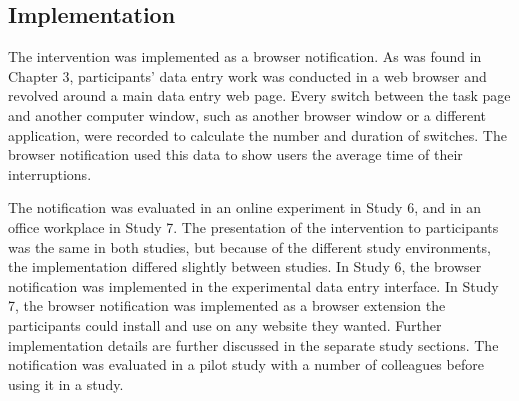 \subsection{Implementation}
The intervention was implemented as a browser notification. As was found in Chapter 3, participants’ data entry work was conducted in a web browser and revolved around a main data entry web page. Every switch between the task page and another computer window, such as another browser window or a different application, were recorded to calculate the number and duration of switches. The browser notification used this data to show users the average time of their interruptions. 

The notification was evaluated in an online experiment in Study 6, and in an office workplace in Study 7. The presentation of the intervention to participants was the same in both studies, but because of the different study environments, the implementation differed slightly between studies. In Study 6, the browser notification was implemented in the experimental data entry interface. In Study 7, the browser notification was implemented as a browser extension the participants could install and use on any website they wanted. Further implementation details are further discussed in the separate study sections.
The notification was evaluated in a pilot study with a number of colleagues before using it in a study.


